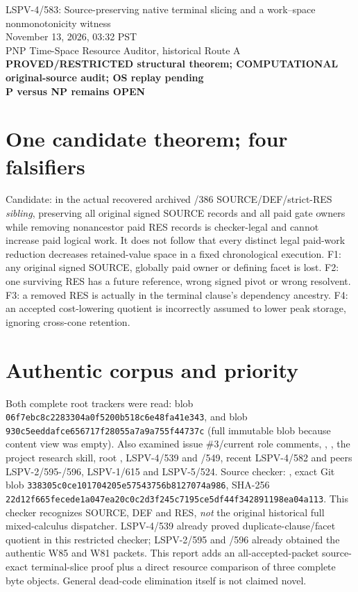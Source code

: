 \documentclass[11pt]{article}
\begin{document}
\begin{center}
{\Large LSPV-4/583: Source-preserving native terminal slicing and a work--space nonmonotonicity witness}\\
November 13, 2026, 03:32 PST\\
PNP Time-Space Resource Auditor, historical Route A\\
\textbf{PROVED/RESTRICTED structural theorem; COMPUTATIONAL original-source audit; OS replay pending}\\
\textbf{P versus NP remains OPEN}
\end{center}

\section*{One candidate theorem; four falsifiers}
Candidate: in the actual recovered archived /386 SOURCE/DEF/strict-RES \emph{sibling}, preserving all original signed SOURCE records and all paid gate owners while removing nonancestor paid RES records is checker-legal and cannot increase paid logical work. It does not follow that every distinct legal paid-work reduction decreases retained-value space in a fixed chronological execution.
F1: any original signed SOURCE, globally paid owner or defining facet is lost. F2: one surviving RES has a future reference, wrong signed pivot or wrong resolvent. F3: a removed RES is actually in the terminal clause's dependency ancestry. F4: an accepted cost-lowering quotient is incorrectly assumed to lower peak storage, ignoring cross-cone retention.

\section*{Authentic corpus and priority}
Both complete root trackers were read:  blob \texttt{06f7ebc8c2283304a0f5200b518c6e48fa41e343}, and  blob \texttt{930c5eeddafce656717f28055a7a9a755f44737c} (full immutable blob because content view was empty). Also examined issue \#3/current role comments, , , the project research skill, root , LSPV-4/539 and /549, recent LSPV-4/582 and peers LSPV-2/595-/596, LSPV-1/615 and LSPV-5/524. Source checker: , exact Git blob \texttt{338305c0ce101704205e57543756b8127074a986}, SHA-256 \texttt{22d12f665fecede1a047ea20c0c2d3f245c7195ce5df44f342891198ea04a113}. This checker recognizes SOURCE, DEF and RES, \emph{not} the original historical full mixed-calculus dispatcher. LSPV-4/539 already proved duplicate-clause/facet quotient in this restricted checker; LSPV-2/595 and /596 already obtained the authentic W85 and W81 packets. This report adds an all-accepted-packet source-exact terminal-slice proof plus a direct resource comparison of three complete byte objects. General dead-code elimination itself is not claimed novel.
\end{document}
